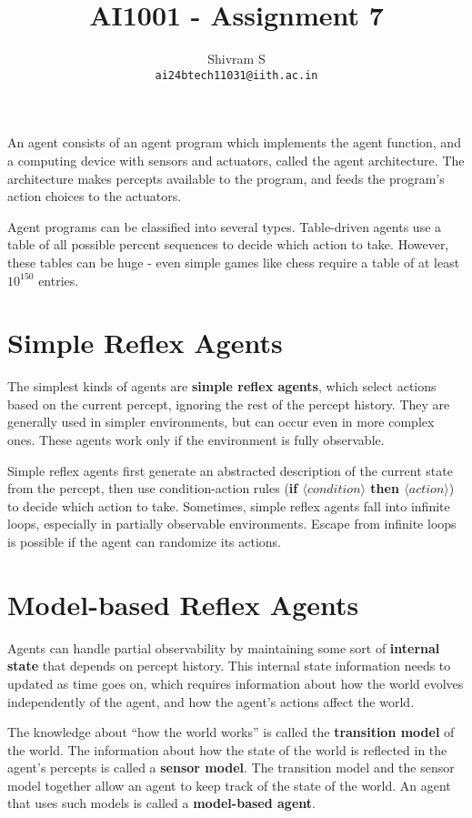 \documentclass{article}
\author{Shivram S \\ \texttt{ai24btech11031@iith.ac.in}}
\title{AI1001 - Assignment 7}
\begin{document}
\maketitle

An agent consists of an agent program which implements the agent function, and a 
computing device with sensors and actuators, called the agent architecture. The
architecture makes percepts available to the program, and feeds the program's action
choices to the actuators.

Agent programs can be classified into several types. Table-driven agents use a 
table of all possible percent sequences to decide which action to take. However,
these tables can be huge - even simple games like chess require a table of at least
$10^{150}$ entries.

\section{Simple Reflex Agents}

The simplest kinds of agents are \textbf{simple reflex agents}, which select actions
based on the current percept, ignoring the rest of the percept history. They are
generally used in simpler environments, but can occur even in more complex ones.
These agents work only if the environment is fully observable.

Simple reflex agents first generate an abstracted description of the 
current state from the percept, then use condition-action rules
(\textbf{if $\langle condition \rangle$ then $\langle action \rangle$}) to decide which
action to take. Sometimes, simple reflex agents fall into infinite loops, especially
in partially observable environments. Escape from infinite loops is possible if
the agent can randomize its actions.

\section{Model-based Reflex Agents}

Agents can handle partial observability by maintaining some sort of \textbf{internal state}
that depends on percept history. This internal state information needs to updated as 
time goes on, which requires information about how the world evolves independently of the
agent, and how the agent's actions affect the world.

The knowledge about ``how the world works'' is called the \textbf{transition model} of the
world. The information about how the state of the world is reflected in the agent's
percepts is called a \textbf{sensor model}. The transition model and the sensor model
together allow an agent to keep track of the state of the world. An agent that uses
such models is called a \textbf{model-based agent}.
\end{document}
